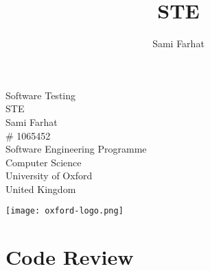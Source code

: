 \documentclass[11pt]{article}
\author{Sami Farhat}
\title{STE}
\begin{document}

\clearpage
\thispagestyle{empty} %
\pagebreak 
\begin{titlepage}
\begin{center}
\vspace*{1cm}
{\Huge Software Testing} \\
\vspace{0.5cm}
{\LARGE STE\\}
\vspace{0.5cm}
\vspace{3.5cm}
{\LARGE Sami Farhat\\}
\vspace{0.1cm}
{\Large \# 1065452\\}
\vspace{0.3cm}
\vfill
\vspace{0.8cm}
Software Engineering Programme\\        
Computer Science\\
\vspace{0.5cm}
University of Oxford\\
United Kingdom\\
\vspace{1.0cm}         

\texttt{[image: oxford-logo.png]}
\end{center}
\end{titlepage}


\clearpage
\tableofcontents 
\thispagestyle{empty} %
\pagebreak
{} %



\section{Code Review}
\end{document}
